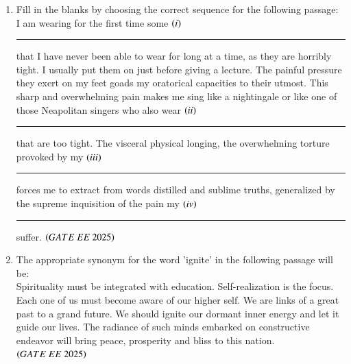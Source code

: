 \documentclass[journal,12pt,onecolumn]{IEEEtran}
\theoremstyle{remark}
\begin{document}
\begin{enumerate}
   \item Fill in the blanks by choosing the correct sequence for the following passage: \\  
 I am wearing for the first time some  $\left(i\right)$\rule{2cm}{0.4pt} that I have never been able to wear for long at a time, as they are horribly tight. I usually put them on just before giving a lecture. The painful pressure they exert on my feet goads my oratorical capacities to their utmost. This sharp and overwhelming pain makes me sing like a nightingale or like one of those Neapolitan singers who also wear  $\left(ii\right)$\rule{2cm}{0.4pt} that are too tight. The visceral physical longing, the overwhelming torture provoked by my  $\left(iii\right)$\rule{2cm}{0.4pt}  forces me to extract from words distilled and sublime truths, generalized by the supreme inquisition of the pain my  $\left(iv\right)$\rule{2cm}{0.4pt} suffer.
\hfill $\left(GATE\ EE\ 2025\right)$ 
    \begin{enumerate}
    \end{enumerate}
  \item The appropriate synonym for the word 'ignite' in the following passage will be: \\ 
Spirituality must be integrated with education. Self-realization is the focus. Each one of us must become aware of our higher self. We are links of a great past to a grand future. We should ignite our dormant inner energy and let it guide our lives. The radiance of such minds embarked on constructive endeavor will bring peace, prosperity and bliss to this nation. 
\hfill $\left(GATE\ EE\ 2025\right)$  
    \begin{enumerate}
\end{enumerate}
\end{enumerate}
\end{document}
